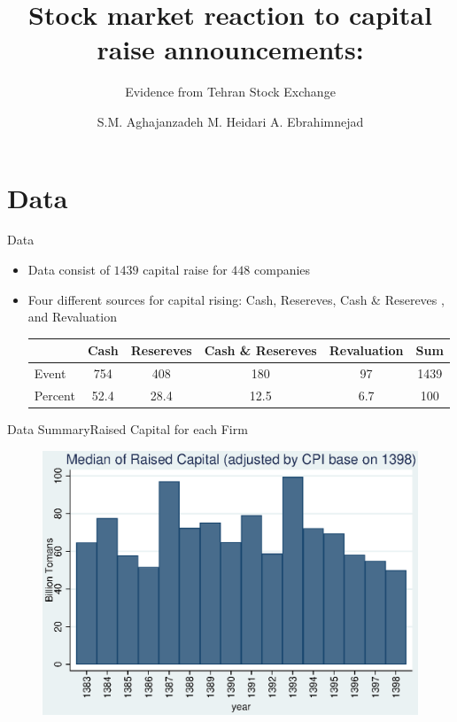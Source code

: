 \documentclass{beamer}
\title[Capital Raise]{Stock market reaction to capital raise announcements:}
\subtitle{Evidence from Tehran Stock Exchange}
\author[Aghajanzadeh, Heidari \&Ebrahimnejad]{S.M. Aghajanzadeh \qquad M. Heidari \qquad A. Ebrahimnejad }
\institute[]{Tehran Institute for Advanced Studies }
\begin{document}
{\maketitle}

\section{Data}
\begin{frame}{Data}
\begin{itemize}
\item Data consist of $1439$ capital raise for $448$ companies 

\item Four different sources for capital rising: Cash, Resereves, Cash \& Resereves , and Revaluation \\

\begin{table}[htbp]
  \centering
\label{t1}
\resizebox{0.7\textwidth}{!}
{
    \begin{tabular}{lccccc}
    \hline
    \hline
          & \multicolumn{1}{l}{Cash} & \multicolumn{1}{c}{Resereves} & \multicolumn{1}{c}{Cash \& Resereves} & \multicolumn{1}{c}{Revaluation} &  \multicolumn{1}{c}{Sum} \\
          \hline
    Event & 754   & 408   & 180   & 97       & 1439 \\
    Percent & 52.4  & 28.4  & 12.5  & 6.7    & 100 \\
    \hline\hline
    \end{tabular}
    }
  \label{tab:addlabel}
  
\end{table}%


\end{itemize}

\end{frame}






\begin{frame}{Data Summary}{Raised Capital for each Firm}
\begin{figure}
\centering
\includegraphics[width=0.7\linewidth]{MedianCapRaiseAdjusted.eps}
\label{fig:mediancapraise}
\end{figure}
\end{frame}
\end{document}

